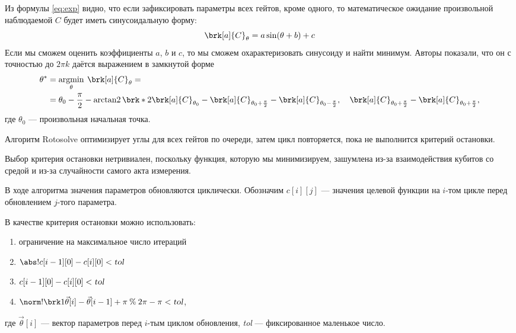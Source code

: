 Из формулы \eqref{eq:exp} видно, что если зафиксировать параметры всех гейтов, кроме одного, то математическое ожидание произвольной наблюдаемой $C$ будет иметь синусоидальную форму:
$$
\brk[a]{C}_\theta = a \sin(\theta + b) + c
$$
Если мы сможем оценить коэффициенты $a$, $b$ и $c$, то мы сможем охарактеризовать синусоиду и найти минимум. Авторы показали, что он с точностью до $2\pi k$ даётся выражением в замкнутой форме
\begin{align*}
\theta^* 
&= \argmin_\theta \: \brk[a]{C}_\theta = \\
&= \theta_0 - \frac{\pi}{2} - \arctantwo \brk*{
   2\brk[a]{C}_{\theta_0} - 
    \brk[a]{C}_{\theta_0 + \frac{\pi}{2}} - 
    \brk[a]{C}_{\theta_0 - \frac{\pi}{2}}
    ,\quad
    \brk[a]{C}_{\theta_0 + \frac{\pi}{2}} - 
    \brk[a]{C}_{\theta_0 + \frac{\pi}{2}}
},
\end{align*}
где $\theta_0$ --- произвольная начальная точка.

Алгоритм Rotosolve оптимизирует углы для всех гейтов по очереди, затем цикл повторяется, пока не выполнится критерий остановки. 


Выбор критерия остановки нетривиален, поскольку функция, которую мы минимизируем, зашумлена из-за взаимодействия кубитов со средой и из-за случайности самого акта измерения.

В ходе алгоритма значения параметров обновляются циклически. Обозначим $c[i][j]$ --- значения целевой функции на $i$-том цикле перед обновлением $j$-того параметра.%

В качестве критерия остановки можно использовать:

\begin{enumerate}[start = 0, itemsep = 0.2em]
    \item ограничение на максимальное число итераций
    \item $\abs!{c[i-1][0] - c[i][0]} < \textsl{tol}$
    \item $c[i-1][0] - c[i][0] < \textsl{tol}$
    \item $\norm!{\brk1{\vec \theta[i] - \vec \theta[i-1] + \pi} \mathbin{\%} 2\pi - \pi} < \textsl{tol}$,
\end{enumerate}

\vspace{0.2em}

где $\vec \theta [i]$ --- вектор параметров перед $i$-тым циклом обновления, \textsl{tol} --- фиксированное маленькое число. 

